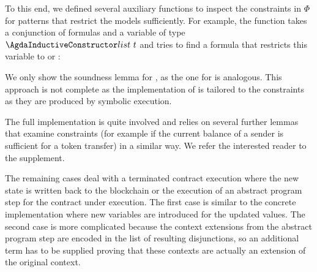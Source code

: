 To this end, we defined several auxiliary functions to inspect the
constraints in $\Phi$ for patterns that restrict the models
sufficiently. For example, the function  takes a
conjunction of formulas and a variable of type $\ACon{list}~t$ and
tries to find a formula that restricts this variable to  or
:
\AbstractFindTTList
\SoundnessFindTTList

We only show the soundness lemma for , as the one for
 is analogous. This approach is not complete as the
implementation of  is tailored to the constraints
as they are produced by symbolic execution. 

The full implementation is quite involved and relies on several
further lemmas that examine constraints (for example if the current
balance of a sender is sufficient for a token transfer) in a similar
way. We refer the interested reader to the supplement.

The remaining cases deal with a terminated contract execution where
the new state is written back to the blockchain or the execution of an abstract program step for the contract under execution.
The first case is similar to the concrete implementation where new variables are introduced
for the updated values.
The second case is more complicated because the context extensions from the abstract program step
are encoded in the list of resulting disjunctions,
so an additional term has to be supplied proving that these contexts are actually an extension
of the original context.


